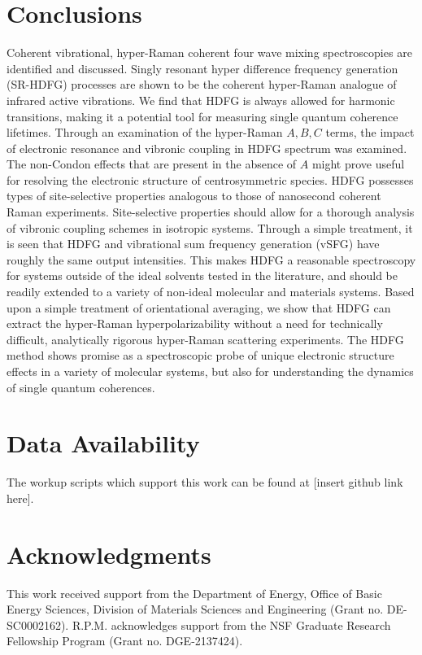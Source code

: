 \documentclass[aip, jcp, reprint, onecolumn]{revtex4-2}
\begin{document}
\section{Conclusions}
Coherent vibrational, hyper-Raman coherent four wave mixing spectroscopies are identified and discussed.
Singly resonant hyper difference frequency generation (SR-HDFG) processes are shown to be the coherent hyper-Raman analogue of infrared active vibrations.
We find that HDFG is always allowed for harmonic transitions, making it a potential tool for measuring single quantum coherence lifetimes. 
Through an examination of the hyper-Raman $A,B,C$ terms, the impact of electronic resonance and vibronic coupling in HDFG spectrum was examined.
The non-Condon effects that are present in the absence of $A$ might prove useful for resolving the electronic structure of centrosymmetric species.
HDFG possesses types of site-selective properties analogous to those of nanosecond coherent Raman experiments. 
Site-selective properties should allow for a thorough analysis of vibronic coupling schemes in isotropic systems.
Through a simple treatment, it is seen that HDFG and vibrational sum frequency generation (vSFG) have roughly the same output intensities. 
This makes HDFG a reasonable spectroscopy for systems outside of the ideal solvents tested in the literature, and should be readily extended to a variety of non-ideal molecular and materials systems. 
Based upon a simple treatment of orientational averaging, we show that HDFG can extract the hyper-Raman hyperpolarizability without a need for technically difficult, analytically rigorous hyper-Raman scattering experiments. 
The HDFG method shows promise as a spectroscopic probe of unique electronic structure effects in a variety of molecular systems, but also for understanding the dynamics of single quantum coherences. 
\section{Data Availability}
The workup scripts which support this work can be found at [insert github link here].

\section{Acknowledgments}
This work received support from the Department of Energy, Office of Basic Energy Sciences, Division of Materials Sciences and Engineering (Grant no. DE-SC0002162).
R.P.M. acknowledges support from the NSF Graduate Research Fellowship Program (Grant no. DGE-2137424). 
\end{document}
